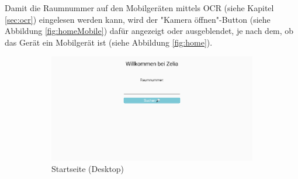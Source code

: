 Damit die Raumnummer auf den Mobilgeräten mittels OCR (siehe Kapitel \ref{sec:ocr}) eingelesen werden kann, wird der "Kamera öffnen"-Button (siehe Abbildung \ref{fig:homeMobile}) dafür angezeigt oder ausgeblendet, je nach dem, ob das Gerät ein Mobilgerät ist (siehe Abbildung \ref{fig:home}).

\begin{figure}[H]
    \begin{subfigure}[c]{0.65\textwidth}
        \centering
        \includegraphics[width=\textwidth]{media/ResponsiveDesign/ZeliaHome.png}
        \caption{Startseite (Desktop)}
    \end{subfigure} \hfill
    \begin{subfigure}[c]{0.35\textwidth}
        \centering

\end{subfigure}
\end{figure}
